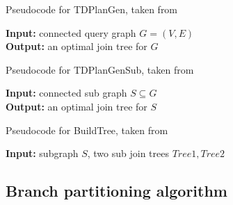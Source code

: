 \documentclass[10pt,journal,compsoc]{IEEEtran}
\begin{document}
\begin{algorithm}
\caption{Pseudocode for TDPlanGen, taken from \cite{FenderMCB}}
\textbf{Input:} connected query graph $G = (V, E)$ \\
\textbf{Output:} an optimal join tree for $G$
\begin{algorithmic}[1]
\EndFor
{}
\EndProcedure
\end{algorithmic}
\end{algorithm}

\begin{algorithm}
\caption{Pseudocode for TDPlanGenSub, taken from \cite{FenderMCB}}
\textbf{Input:} connected sub graph $S \subseteq G$ \\
\textbf{Output:} an optimal join tree for $S$
\begin{algorithmic}[1]
\EndFor
\EndIf
{}
\EndProcedure
\end{algorithmic}
\end{algorithm}

\begin{algorithm}
\caption{Pseudocode for BuildTree, taken from \cite{FenderMCB}}
\textbf{Input:} subgraph $S$, two sub join trees $Tree1, Tree2$ 
\begin{algorithmic}[1]
\EndIf
{}
\EndIf
\EndProcedure
\end{algorithmic}
\end{algorithm}


\subsection{Branch partitioning algorithm}
\end{document}
